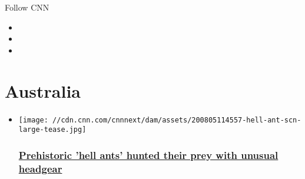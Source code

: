 Follow CNN

\begin{itemize}
\item
\item
\item
\end{itemize}

\hypertarget{australia}{%
\section{Australia}\label{australia}}

\begin{itemize}
\item
  \href{/2020/08/06/world/prehistoric-hell-ant-amber-fossil-trnd-scn/index.html}{}

  \texttt{[image: //cdn.cnn.com/cnnnext/dam/assets/200805114557-hell-ant-scn-large-tease.jpg]}

  \hypertarget{prehistoric-hell-ants-hunted-their-prey-with-unusual-headgear}{%
  \subsubsection{\texorpdfstring{\href{/2020/08/06/world/prehistoric-hell-ant-amber-fossil-trnd-scn/index.html}{Prehistoric
  'hell ants' hunted their prey with unusual
  headgear}}{Prehistoric 'hell ants' hunted their prey with unusual headgear}}\label{prehistoric-hell-ants-hunted-their-prey-with-unusual-headgear}}
\end{itemize}

